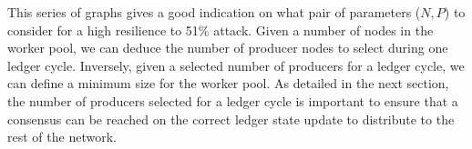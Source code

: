 This series of graphs gives a good indication on what pair of parameters ($N,P$) to consider for a high resilience to 51\% attack. Given a number of nodes in the worker pool, we can deduce the number of producer nodes to select during one ledger cycle. Inversely, given a selected number of producers for a ledger cycle, we can define a minimum size for the worker pool. As detailed in the next section, the number of producers selected for a ledger cycle is important to ensure that a consensus can be reached on the correct ledger state update to distribute to the rest of the network.

